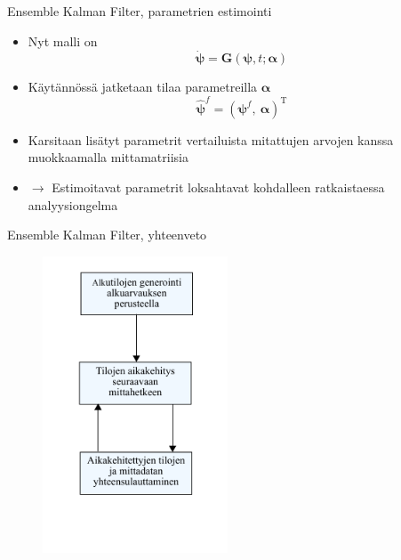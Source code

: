 \documentclass{beamer}
\begin{document}
\begin{frame}{Ensemble Kalman Filter, parametrien estimointi}

\begin{itemize}
\item Nyt malli on
\[
\boldsymbol{\dot{\psi}} = \boldsymbol{G}(\boldsymbol{\psi},t;\boldsymbol{\alpha})
\]
\item Käytännössä jatketaan tilaa parametreilla $\boldsymbol{\alpha}$
\[ \boldsymbol{\hat{\psi}}^f = \left(\boldsymbol{\psi}^f,~\boldsymbol{\alpha}\right)^\mathrm{T} \]
\item Karsitaan lisätyt parametrit vertailuista mitattujen arvojen kanssa muokkaamalla mittamatriisia
\item $\rightarrow$ Estimoitavat parametrit loksahtavat kohdalleen ratkaistaessa analyysiongelma
\end{itemize}

\end{frame}

\begin{frame}{Ensemble Kalman Filter, yhteenveto}

\begin{figure}
\includegraphics[width=5.5cm]{enkf_luuppi.pdf}
\end{figure}

\end{frame}
\end{document}
